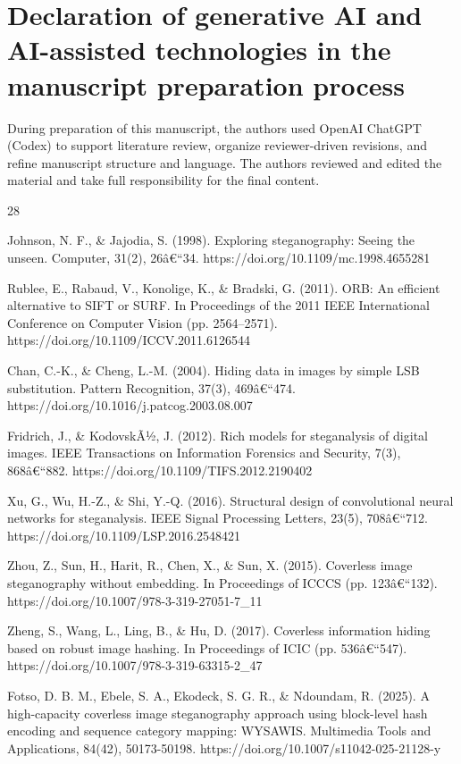 \documentclass[preprint,12pt]{elsarticle}
\theoremstyle{plain}
\begin{document}
\section*{Declaration of generative AI and AI-assisted technologies in the manuscript preparation process}
During preparation of this manuscript, the authors used OpenAI ChatGPT (Codex) to support literature review, organize reviewer-driven revisions, and refine manuscript structure and language. The authors reviewed and edited the material and take full responsibility for the final content.
\begin{thebibliography}{28}

Johnson, N. F., \& Jajodia, S. (1998). Exploring steganography: Seeing the unseen. Computer, 31(2), 26â€“34. https://doi.org/10.1109/mc.1998.4655281

Rublee, E., Rabaud, V., Konolige, K., \& Bradski, G. (2011). ORB: An efficient alternative to SIFT or SURF. In Proceedings of the 2011 IEEE International Conference on Computer Vision (pp. 2564--2571). https://doi.org/10.1109/ICCV.2011.6126544

Chan, C.-K., \& Cheng, L.-M. (2004). Hiding data in images by simple LSB substitution. Pattern Recognition, 37(3), 469â€“474. https://doi.org/10.1016/j.patcog.2003.08.007

 Fridrich, J., \& KodovskÃ½, J. (2012). Rich models for steganalysis of digital images. IEEE Transactions on Information Forensics and Security, 7(3), 868â€“882. https://doi.org/10.1109/TIFS.2012.2190402

Xu, G., Wu, H.-Z., \& Shi, Y.-Q. (2016). Structural design of convolutional neural networks for steganalysis. IEEE Signal Processing Letters, 23(5), 708â€“712. https://doi.org/10.1109/LSP.2016.2548421

Zhou, Z., Sun, H., Harit, R., Chen, X., \& Sun, X. (2015). Coverless image steganography without embedding. In Proceedings of ICCCS (pp. 123â€“132). https://doi.org/10.1007/978-3-319-27051-7\_11

Zheng, S., Wang, L., Ling, B., \& Hu, D. (2017). Coverless information hiding based on robust image hashing. In Proceedings of ICIC (pp. 536â€“547). https://doi.org/10.1007/978-3-319-63315-2\_47

Fotso, D. B. M., Ebele, S. A., Ekodeck, S. G. R., \& Ndoundam, R. (2025). A high-capacity coverless image steganography approach using block-level hash encoding and sequence category mapping: WYSAWIS. Multimedia Tools and Applications, 84(42), 50173-50198. https://doi.org/10.1007/s11042-025-21128-y


\end{thebibliography}
\end{document}

